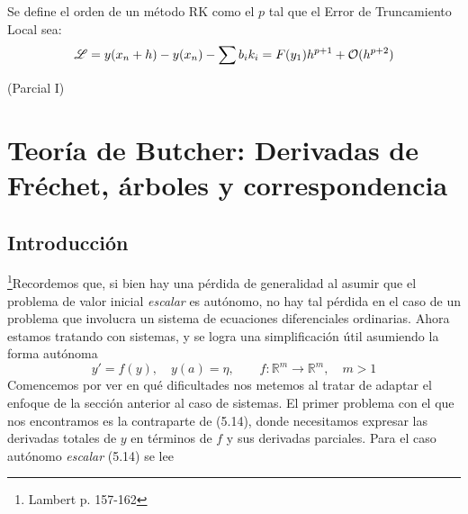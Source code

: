 \begin{defi}
    Se define el orden de un m\'etodo RK como el $p$ tal que el Error de Truncamiento Local sea:
    $$\mathscr L = y(x_n +h) - y(x_n) - \sum b_i k_i = F(y_1) h^{p+1} + \mathcal{O} (h^{p+2})$$
\end{defi}
(Parcial I)
\newpage 


\section{Teoría de Butcher: Derivadas de Fréchet, \'arboles y correspondencia} 
\subsection{Introducci\'on} 
\footnote{Lambert p. 157-162}Recordemos que, si bien hay una pérdida de generalidad al asumir que el problema de valor inicial \textit{escalar} es autónomo, no hay tal pérdida en el caso de un problema que involucra un sistema de ecuaciones diferenciales ordinarias. Ahora estamos tratando con sistemas, y se logra una simplificación útil asumiendo la forma autónoma
\begin{equation*}
y' = f(y), \quad y(a) = \eta, \qquad f : \mathbb{R}^m \to \mathbb{R}^m, \quad m > 1 \tag{5.22}
\end{equation*}
Comencemos por ver en qué dificultades nos metemos al tratar de adaptar el enfoque de la sección anterior al caso de sistemas. El primer problema con el que nos encontramos es la contraparte de (5.14), donde necesitamos expresar las derivadas totales de $y$ en términos de $f$ y sus derivadas parciales. Para el caso autónomo \textit{escalar} (5.14) se lee
